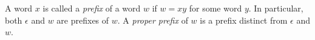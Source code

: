 

\setcounter{section}{2}
\setcounter{subsection}{2}
\setcounter{dfn}{9}

\begin{dfn}
A word $x$ is called a \emph{prefix} of a word $w$ if $w = xy$ for some word $y$.
In particular, both $\epsilon$ and $w$ are prefixes of $w$.
A \emph{proper prefix} of $w$ is a prefix distinct from $\epsilon$ and $w$.
\end{dfn}

